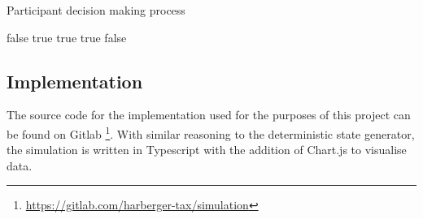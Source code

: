 \begin{algorithm}[H]
\caption{Participant decision making process}
\label{algorithm:checkparticipation}
\begin{algorithmic}[1]
        \State \Return false
    \EndIf
        \State \Return true
    \EndIf
            \State \Return true
        \EndIf
    \EndIf
        \State \Return true
    \EndIf
    \State \Return false
\EndProcedure
\end{algorithmic}
\end{algorithm}

\subsection{Implementation}

The source code for the implementation used for the purposes of this project can be found on Gitlab \footnote{\url{https://gitlab.com/harberger-tax/simulation}}. With similar reasoning to the deterministic state generator, the simulation is written in Typescript with the addition of Chart.js \cite{chartjs} to visualise data. 